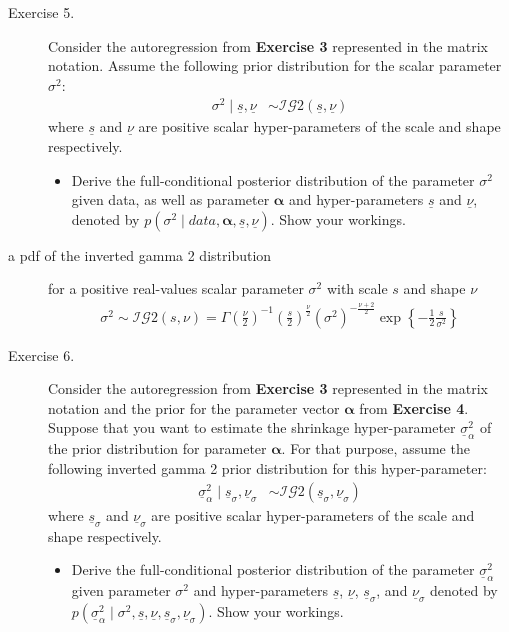 \documentclass[12pt]{article}
\begin{document}
\begin{adjustwidth}{1cm}{1cm}
\begin{description}
\bigskip\item[Exercise 5.] Consider the autoregression from \textbf{Exercise 3} represented in the matrix notation. Assume the following prior distribution for the scalar parameter $\sigma^2$:
\begin{align}
\sigma^2\mid\underline{s},\underline{\nu} &\sim\mathcal{IG}2(\underline{s},\underline{\nu})
\end{align}
where $\underline{s}$ and $\underline{\nu}$ are positive scalar hyper-parameters of the scale and shape respectively.
\begin{itemize}
\item Derive the full-conditional posterior distribution of the parameter $\sigma^2$ given data, as well as parameter $\boldsymbol\alpha$ and hyper-parameters $\underline{s}$ and $\underline{\nu}$, denoted by $p\left(\sigma^2\mid data, \boldsymbol\alpha, \underline{s}, \underline{\nu}\right)$. Show your workings.
\end{itemize}



\item[a pdf of the inverted gamma 2 distribution] for a positive real-values scalar parameter $\sigma^2$ with scale $s$ and shape $\nu$
\begin{align}
\sigma^2\sim\mathcal{IG}2\left(s, \nu\right) = \Gamma\left(\frac{\nu}{2}\right)^{-1}\left(\frac{s}{2}\right)^{\frac{\nu}{2}} \left(\sigma^2\right)^{-\frac{\nu+2}{2}}\exp\left\{ -\frac{1}{2}\frac{s}{\sigma^2} \right\}
\end{align}


\bigskip\item[Exercise 6.] Consider the autoregression from \textbf{Exercise 3} represented in the matrix notation and the prior for the parameter vector $\boldsymbol\alpha$ from \textbf{Exercise 4}. Suppose that you want to estimate the shrinkage hyper-parameter $\underline{\sigma}^2_\alpha$ of the prior distribution for parameter $\boldsymbol\alpha$. For that purpose, assume the following inverted gamma 2 prior distribution for this hyper-parameter:
\begin{align}
\underline{\sigma}^2_\alpha \mid \underline{s}_\sigma,\underline{\nu}_\sigma &\sim\mathcal{IG}2(\underline{s}_\sigma,\underline{\nu}_\sigma)
\end{align}
where $\underline{s}_\sigma$ and $\underline{\nu}_\sigma$ are positive scalar hyper-parameters of the scale and shape respectively.
\begin{itemize}
\item Derive the full-conditional posterior distribution of the parameter $\underline{\sigma}^2_\alpha$ given parameter $\sigma^2$ and hyper-parameters $\underline{s}$, $\underline{\nu}$, $\underline{s}_\sigma$, and $\underline{\nu}_\sigma$ denoted by $p\left(\underline{\sigma}^2_\alpha\mid \sigma^2, \underline{s}, \underline{\nu},\underline{s}_\sigma,\underline{\nu}_\sigma\right)$. Show your workings.
\end{itemize}


\end{description}
\end{adjustwidth}
\end{document}
